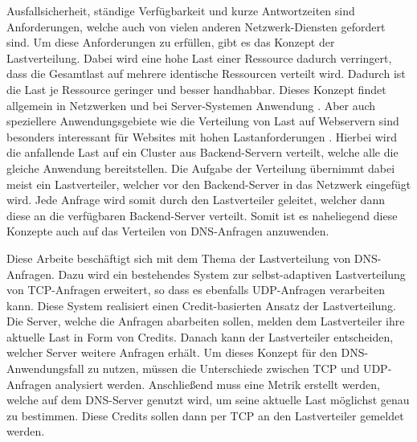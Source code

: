 \documentclass[a4paper, 12pt, BCOR10mm, DIV12, toc=bibliography, toc=listof, german]{scrbook}
\begin{document}
		Ausfallsicherheit, ständige Verfügbarkeit und kurze Antwortzeiten sind Anforderungen, welche
		auch von vielen anderen Netzwerk-Diensten gefordert sind. Um diese Anforderungen zu erfüllen,
		gibt es das Konzept der Lastverteilung. Dabei wird eine hohe Last einer Ressource dadurch
		verringert, dass die Gesamtlast auf mehrere identische Ressourcen verteilt wird. Dadurch ist die
		Last je Ressource geringer und besser handhabbar. Dieses Konzept findet allgemein in Netzwerken
		und bei Server-Systemen Anwendung \cite{bourke2001, kopparapu2002}. Aber auch speziellere
		Anwendungsgebiete wie die Verteilung von Last auf Webservern sind besonders interessant für
		Websites mit hohen Lastanforderungen \cite{meplho2012}. Hierbei wird die anfallende Last auf ein
		Cluster aus Backend-Servern verteilt, welche alle	die gleiche Anwendung bereitstellen. Die
		Aufgabe der Verteilung übernimmt dabei meist ein Lastverteiler, welcher vor den Backend-Server
		in das Netzwerk eingefügt wird. Jede Anfrage wird somit durch den Lastverteiler geleitet,
		welcher dann diese an die verfügbaren Backend-Server verteilt.  Somit ist es naheliegend diese
		Konzepte auch auf das Verteilen von DNS-Anfragen anzuwenden.

		Diese Arbeite beschäftigt sich mit dem Thema der Lastverteilung von DNS-Anfragen. Dazu wird ein
		bestehendes System \cite{scsczile2008,zinke2012,salbnet} zur selbst-adaptiven Lastverteilung von
		TCP-Anfragen erweitert, so dass es ebenfalls UDP-Anfragen verarbeiten kann. Diese System
		realisiert einen Credit-basierten Ansatz der Lastverteilung. Die Server, welche die Anfragen
		abarbeiten sollen, melden dem Lastverteiler ihre aktuelle Last in Form von Credits. Danach kann
		der Lastverteiler entscheiden, welcher Server weitere Anfragen erhält. Um dieses Konzept für den
		DNS-Anwendungsfall zu nutzen, müssen die Unterschiede zwischen TCP und UDP-Anfragen analysiert
		werden. Anschließend muss eine Metrik erstellt werden, welche auf dem DNS-Server genutzt wird,
		um seine aktuelle Last möglichst genau zu bestimmen. Diese Credits sollen dann per TCP an den
		Lastverteiler gemeldet werden.
\end{document}

